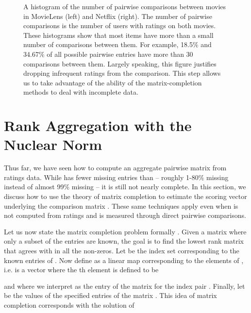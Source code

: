 \documentclass{sig-alternate}
\renewcommand{\cite}{\citep}
\begin{document}
\begin{figure*}
\centering
{}  
\quad 
{}  
\caption{A histogram of the number of pairwise comparisons 
between movies in MovieLens (left) and Netflix (right).  The 
number of pairwise comparisons is the number of users with ratings
on both movies.  These histograms show that most items
have more than a small number of comparisons between them.  
For example, 18.5\% and 34.67\% of all possible pairwise
entries have more than 30 
comparisons between them.  Largely speaking, this figure
justifies dropping infrequent ratings from the comparison.
This step allows us to take advantage of the ability
of the matrix-completion methods to deal with incomplete
data. }
\label{fig:pairwise}
\end{figure*}



\section{Rank Aggregation with the\\ Nuclear Norm} 
\label{sec:ranking-nn}

Thus far, we have seen how to compute an aggregate
pairwise matrix  from ratings data.
While  has fewer missing entries than  --
roughly 1-80\% missing instead of almost 99\% missing
-- it is still not nearly complete.  
In this section, we discuss how to use the theory
of matrix completion to estimate the scoring
vector underlying the comparison matrix .
These same techniques apply even when  is not
computed from ratings and is measured through
direct pairwise comparisons.  

Let us now state the matrix completion problem formally
\cite{candes2009-exact-completion,recht2009-nuclear-norm}.
Given a matrix  where only a subset of the entries
are known, the goal is to find the 
lowest rank matrix  that agrees with  in all
the non-zeros.  
Let  be the index set corresponding
to the known entries of .
Now define  as a linear map corresponding to the
elements of , i.e.  is a vector where
the th element is defined to be

and where we interpret  as the entry of the 
matrix  for the index pair .
Finally, let  be the values of the specified 
entries of the matrix .  
This idea of matrix completion corresponds with the
solution of 
\end{document}
